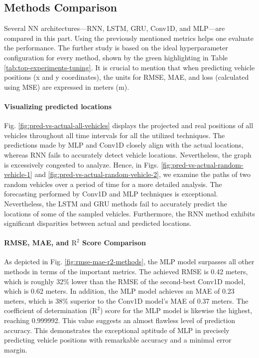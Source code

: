 \documentclass[journal,onecolumn]{IEEEtran}
\begin{document}
{\subsection{Methods Comparison} \label{sec-comparison}
Several NN architectures—RNN, LSTM, GRU, Conv1D, and MLP—are compared in this part. Using the previously mentioned metrics helps one evaluate the performance. The further study is based on the ideal hyperparameter configuration for every method, shown by the green highlighting in Table \ref{tab:top-experiments-tuning}. It is crucial to mention that when predicting vehicle positions (x and y coordinates), the units for RMSE, MAE, and loss (calculated using MSE) are expressed in meters (m).

\paragraph{Visualizing predicted locations}
Fig. \ref{fig:pred-vs-actual-all-vehicles} displays the projected and real positions of all vehicles throughout all time intervals for all the utilized techniques. The predictions made by MLP and Conv1D closely align with the actual locations, whereas RNN fails to accurately detect vehicle locations. Nevertheless, the graph is excessively congested to analyze. Hence, in Figs. \ref{fig:pred-vs-actual-random-vehicle-1} and \ref{fig:pred-vs-actual-random-vehicle-2}, we examine the paths of two random vehicles over a period of time for a more detailed analysis. The forecasting performed by Conv1D and MLP techniques is exceptional. Nevertheless, the LSTM and GRU methods fail to accurately predict the locations of some of the sampled vehicles. Furthermore, the RNN method exhibits significant disparities between actual and predicted locations.

\paragraph{RMSE, MAE, and $\text{R}^2$ Score Comparison}
As depicted in Fig. \ref{fig:rmse-mae-r2-methods}, the MLP model surpasses all other methods in terms of the important metrics. The achieved RMSE is 0.42 meters, which is roughly 32\% lower than the RMSE of the second-best Conv1D model, which is 0.62 meters. In addition, the MLP model achieves an MAE of 0.23 meters, which is 38\% superior to the Conv1D model's MAE of 0.37 meters. The coefficient of determination ($\text{R}^2$) score for the MLP model is likewise the highest, reaching 0.999992. This value suggests an almost flawless level of prediction accuracy. This demonstrates the exceptional aptitude of MLP in precisely predicting vehicle positions with remarkable accuracy and a minimal error margin.

}
\end{document}
